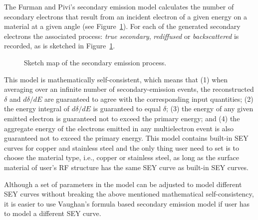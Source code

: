 The Furman and Pivi's secondary emission model calculates the number of secondary electrons that result from an incident electron of a given energy on a material at a given angle (see Figure~\ref{incident electrons}). For each of the generated secondary electrons the associated process: {\em true secondary}, {\em rediffused} or {\em backscattered} is recorded, as is sketched in Figure~\ref{incident electrons}.  
\begin{figure}
    \centering
    
    \caption{Sketch map of the secondary emission process.}
    \label{incident electrons}
\end{figure}
This model is mathematically self-consistent, which means that (1) when averaging over an infinite number of secondary-emission events, the reconstructed $\delta$ and $d\delta /dE$ are guaranteed to agree with the corresponding input quantities; (2) the energy integral of $d\delta/dE$ is guaranteed to equal $\delta$; (3) the energy of any given emitted electron is guaranteed not to exceed the primary energy; and (4) the aggregate energy of the electrons emitted in any multielectron event is also guaranteed not to exceed the primary energy. This model contains built-in SEY curves for copper and stainless steel and the only thing user need to set is to choose the material type, i.e., copper or stainless steel, as long as the surface material of user's RF structure has the same SEY curve as built-in SEY curves. 

Although a set of parameters in the model can be adjusted to model different SEY curves without breaking the above mentioned mathematical self-consistency, it is easier to use Vaughan's formula based secondary emission model if user has to model a different SEY curve.

